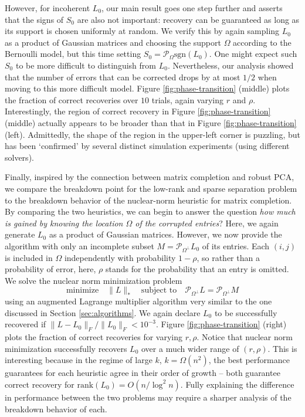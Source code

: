 However, for incoherent $L_0$, our main result goes one step further and asserts that the signs of $S_0$ are also not important: recovery can be guaranteed as long as its support is chosen uniformly at random. We verify this by again sampling $L_0$ as a product of Gaussian matrices and choosing the support $\Omega$ according to the Bernoulli model, but this time setting $S_0 = \mathcal{P}_{\Omega}
\mathrm{sgn}(L_0)$. One might expect such $S_0$ to be more difficult to distinguish from $L_0$. Nevertheless, our analysis showed that the number of errors that can be corrected drops by at most $1/2$ when moving to this more difficult model. Figure \ref{fig:phase-transition}
(middle) plots the fraction of correct recoveries over $10$ trials, again varying $r$ and $\rho$. Interestingly, the region of correct recovery in Figure \ref{fig:phase-transition} (middle) actually appears to be broader than that in Figure \ref{fig:phase-transition}
(left). Admittedly, the shape of the region in the upper-left corner is puzzling, but has been `confirmed' by several distinct simulation experiments (using different solvers). 

Finally, inspired by the connection between matrix completion and robust PCA, we compare the breakdown point for the low-rank and sparse separation problem to the breakdown behavior of the nuclear-norm heuristic for matrix completion. By comparing the two heuristics, we can begin to answer the question {\em how much is gained by knowing the location $\Omega$ of the corrupted entries}? Here, we again generate $L_0$ as a product of Gaussian matrices. However, we now provide the algorithm with only an incomplete subset $M = \mathcal{P}_{\Omega^\perp} L_0$ of its entries. Each $(i,j)$ is included in $\Omega$ independently with probability $1-\rho$, so rather than a probability of error, here,
$\rho$ stands for the probability that an entry is omitted. We solve the nuclear norm minimization problem
\[
    \text{minimize} \quad \|L\|_* \quad \text{subject to} \quad \mathcal{P}_{\Omega^\perp} L = \mathcal{P}_{\Omega^\perp} M 
\]
using an augmented Lagrange multiplier algorithm very similar to the one discussed in Section \ref{sec:algorithms}. We again declare $L_0$ to be successfully recovered if $\| L - L_0 \|_F / \| L_0 \|_F < 10^{-3}$. Figure \ref{fig:phase-transition} (right) plots the fraction of correct recoveries for varying $r,\rho$. Notice that nuclear norm minimization successfully recovers $L_0$ over a much wider range of
$(r,\rho)$. This is interesting because in the regime of large $k$, $k = \Omega(n^2)$, the best performance guarantees for each heuristic agree in their order of growth -- both guarantee correct recovery for
$\mathrm{rank}(L_0) = O(n/\log^2 n)$. Fully explaining the difference in performance between the two problems may require a sharper analysis of the breakdown behavior of each.

